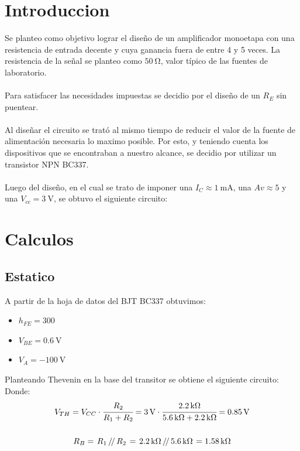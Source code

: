 \documentclass[a4paper,12pt]{article}
\newcommand{\parallelTwo}[2]{\left.#1\,\middle/\!\middle/\,#2\right.}
\newcommand{\mR}[1]{\SI{#1}{\kilo\ohm}}
\newcommand{\mI}[1]{\SI{#1}{\milli\ampere}}
\newcommand{\mV}[1]{\SI{#1}{\volt}}
\begin{document}


\section{Introduccion}
    Se planteo como objetivo lograr el diseño de un amplificador monoetapa con una resistencia de entrada decente
    y cuya ganancia fuera de entre 4 y 5 veces. 
    La resistencia de la señal se planteo como $\SI{50}{\ohm}$, valor típico de las fuentes de laboratorio.
    \\ \\
    Para satisfacer las necesidades impuestas se decidio por el diseño de un $R_E$ sin puentear. 
    \\ \\
    Al diseñar el circuito se trató al mismo tiempo de reducir el valor de la fuente de alimentación necesaria lo maximo
    posible. Por esto, y teniendo cuenta los dispositivos que se encontraban a nuestro alcance, se decidio por utilizar
    un transistor NPN BC337. 
    \\ \\
    Luego del diseño, en el cual se trato de imponer una $I_C \approx \mI{1}$, una $Av \approx 5$ y una $V_{cc} = \mV{3}$, 
    se obtuvo el siguiente circuito: 

\newpage
\section{Calculos}

\subsection{Estatico}
    A partir de la hoja de datos del BJT BC337 obtuvimos:
    \begin{itemize}
        \item $h_{FE} = 300$
        \item $V_{BE} = \mV{0.6}$
        \item $V_A = \mV{-100}$
    \end{itemize}

    Planteando Thevenin en la base del transitor se obtiene el siguiente circuito:
    Donde:
    \begin{gather*}
        V_{TH} = V_{CC} \cdot \cfrac{R_2}{R_1 + R_2} 
            = \mV{3} \cdot \cfrac{\mR{2.2}}{\mR{5.6} + \mR{2.2}} = \mV{0.85}
        \\ \\
        R_B = \parallelTwo{R_1}{R_2} = \parallelTwo{\mR{2.2}}{\mR{5.6}} = \mR{1.58}
    \end{gather*}
\end{document}
